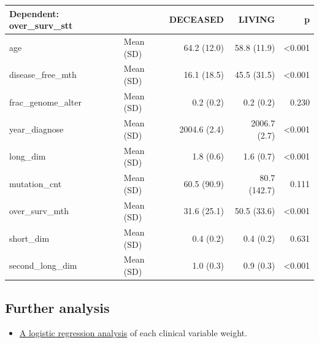 \documentclass[]{article}
\newenvironment{Shaded}{\begin{snugshade}}{\end{snugshade}}
\newcommand{\KeywordTok}[1]{\textcolor[rgb]{0.13,0.29,0.53}{\textbf{#1}}}
\newcommand{\DataTypeTok}[1]{\textcolor[rgb]{0.13,0.29,0.53}{#1}}
\newcommand{\StringTok}[1]{\textcolor[rgb]{0.31,0.60,0.02}{#1}}
\newcommand{\OtherTok}[1]{\textcolor[rgb]{0.56,0.35,0.01}{#1}}
\newcommand{\OperatorTok}[1]{\textcolor[rgb]{0.81,0.36,0.00}{\textbf{#1}}}
\newcommand{\NormalTok}[1]{#1}
\providecommand{\tightlist}{%
  \setlength{\itemsep}{0pt}\setlength{\parskip}{0pt}}
\begin{document}
\begin{Shaded}
\end{Shaded}

\begin{longtable}[]{@{}llrrr@{}}
\toprule
Dependent: over\_surv\_stt & & DECEASED & LIVING & p\tabularnewline
\midrule
\endhead
age & Mean (SD) & 64.2 (12.0) & 58.8 (11.9) &
\textless{}0.001\tabularnewline
disease\_free\_mth & Mean (SD) & 16.1 (18.5) & 45.5 (31.5) &
\textless{}0.001\tabularnewline
frac\_genome\_alter & Mean (SD) & 0.2 (0.2) & 0.2 (0.2) &
0.230\tabularnewline
year\_diagnose & Mean (SD) & 2004.6 (2.4) & 2006.7 (2.7) &
\textless{}0.001\tabularnewline
long\_dim & Mean (SD) & 1.8 (0.6) & 1.6 (0.7) &
\textless{}0.001\tabularnewline
mutation\_cnt & Mean (SD) & 60.5 (90.9) & 80.7 (142.7) &
0.111\tabularnewline
over\_surv\_mth & Mean (SD) & 31.6 (25.1) & 50.5 (33.6) &
\textless{}0.001\tabularnewline
short\_dim & Mean (SD) & 0.4 (0.2) & 0.4 (0.2) & 0.631\tabularnewline
second\_long\_dim & Mean (SD) & 1.0 (0.3) & 0.9 (0.3) &
\textless{}0.001\tabularnewline
\bottomrule
\end{longtable}

\subsection{Further analysis}\label{further-analysis}

\begin{itemize}
\tightlist
\item
  \href{3.logistic_regression.md}{A logistic regression analysis} of
  each clinical variable weight.
\end{itemize}
\end{document}
